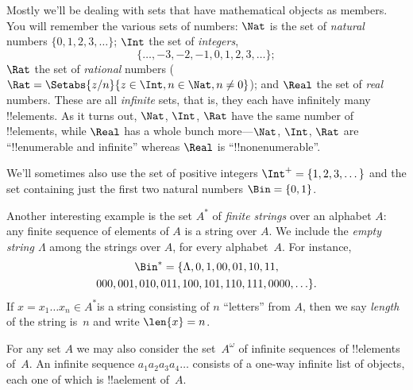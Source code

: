 \documentclass[../../../include/open-logic-section]{subfiles}
\begin{document}

\begin{ex}
Mostly we'll be dealing with sets that have mathematical objects as
members. You will remember the various sets of numbers: $\Nat$
is the set of \emph{natural} numbers $\{0, 1, \allowbreak 2, 3, \dots\}$;
$\Int$ the set of \emph{integers},
\[
\{\dots, -3, -2,
-1, 0, 1, 2, 3, \dots\};
\]
$\Rat$ the set of
\emph{rational} numbers ($\Rat = \Setabs{z/n}{z \in \Int, n \in \Nat, n \neq 0}$); and
$\Real$ the set of \emph{real} numbers. These are all \emph{infinite}
sets, that is, they each have infinitely many !!{element}s. As it turns
out, $\Nat$, $\Int$, $\Rat$ have the same number
of !!{element}s, while $\Real$ has a whole bunch more---$\Nat$,
$\Int$, $\Rat$ are ``!!{enumerable} and infinite'' whereas
$\Real$ is ``!!{nonenumerable}''.

We'll sometimes also use the set of positive integers $\Int^+ = \{1,
2, 3, \dots\}$ and the set containing just the first two natural
numbers $\Bin = \{0, 1\}$.
\end{ex}

\begin{ex}[Strings]
Another interesting example  is the set $A^{*}$ of
\emph{finite strings} over an alphabet $A$: any finite sequence of elements of
$A$ is a string over $A$. We include the \emph{empty string $\Lambda$}
among the strings over $A$, for every alphabet~$A$. For instance,
\begin{multline*}
\Bin^*
=\{\Lambda,0,1,00,01,10,11,\\
000,001,010,011,100,101,110,111,0000,\ldots\}.
\end{multline*}
If $x=x_{1}\ldots x_{n}\in A^{*}$is a string consisting of $n$
``letters'' from $A$, then we say \emph{length} of the string is~$n$
and write $\len{x}=n$.
\end{ex}

\begin{ex}
For any set $A$ we may also consider the set~$A^\omega$ of infinite
sequences of !!{element}s of~$A$. An infinite sequence
$a_1a_2a_3a_4\dots$ consists of a one-way infinite list of objects,
each one of which is !!a{element} of~$A$.
\end{ex}
\end{document}
